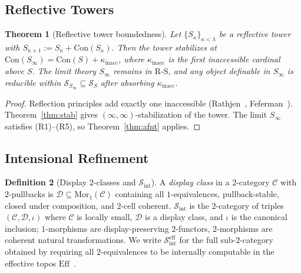 \documentclass[11pt]{article}
\theoremstyle{plain}
\newtheorem{theorem}{Theorem}[section]
\theoremstyle{definition}
\newtheorem{definition}[theorem]{Definition}
\newcommand{\RS}{\mathrm{R\text{-}S}}
\newcommand{\cS}{\mathcal{S}}
\newcommand{\cC}{\mathcal{C}}
\newcommand{\cD}{\mathcal{D}}
\newcommand{\Sint}{\cS_{\mathrm{int}}}
\newcommand{\Mor}{\mathrm{Mor}}
\newcommand{\Con}{\mathrm{Con}}
\begin{document}
\subsection{Reflective Towers}

\begin{theorem}[Reflective tower boundedness]\label{thm:reflective}
Let $\{S_\kappa\}_{\kappa < \lambda}$ be a reflective tower with $S_{\kappa + 1} := S_\kappa + \Con(S_\kappa)$. Then the tower stabilizes at $\Con(S_\infty) = \Con(S) + \kappa_{\mathrm{inacc}}$, where $\kappa_{\mathrm{inacc}}$ is the first inaccessible cardinal above $S$. The limit theory $S_\infty$ remains in $\RS$, and any object definable in $S_\infty$ is reducible within $\cS_{S_\infty} \subseteq \cS_S$ after absorbing $\kappa_{\mathrm{inacc}}$.
\end{theorem}

\begin{proof}
Reflection principles add exactly one inaccessible (Rathjen~\cite{Rathjen1999}, Feferman~\cite{Feferman1964}). Theorem~\ref{thm:stab} gives $(\infty, \infty)$-stabilization of the tower. The limit $S_\infty$ satisfies (R1)--(R5), so Theorem~\ref{thm:afnt} applies.
\end{proof}

\subsection{Intensional Refinement}

\begin{definition}[Display $2$-classes and $\Sint$]\label{def:Sint}
A \emph{display class} in a $2$-category $\cC$ with $2$-pullbacks is $\cD \subseteq \Mor_1(\cC)$ containing all $1$-equivalences, pullback-stable, closed under composition, and $2$-cell coherent. $\Sint$ is the $2$-category of triples $(\cC, \cD, \iota)$ where $\cC$ is locally small, $\cD$ is a display class, and $\iota$ is the canonical inclusion; $1$-morphisms are display-preserving $2$-functors, $2$-morphisms are coherent natural transformations. We write $\Sint^{\mathrm{eff}}$ for the full sub-$2$-category obtained by requiring all $2$-equivalences to be internally computable in the effective topos $\mathrm{Eff}$~\cite{Hyland1982}.
\end{definition}
\end{document}
